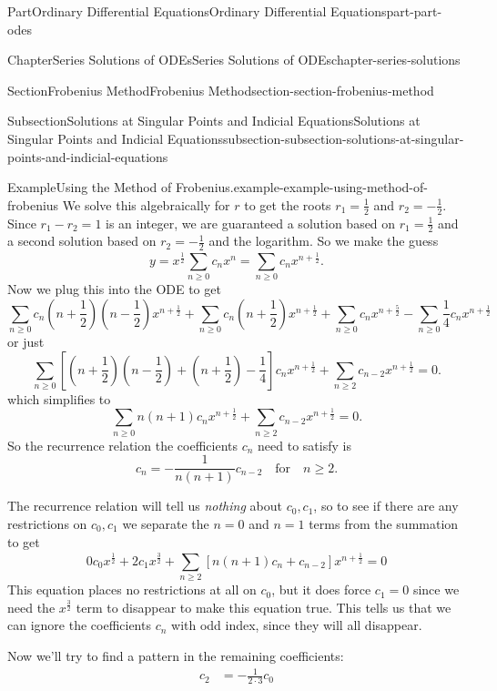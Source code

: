 \documentclass[twoside,10pt,]{book}
\numberwithin{equation}{part}
\begin{document}
\begin{partptx}{Part}{Ordinary Differential Equations}{}{Ordinary Differential Equations}{}{}{part-part-odes}
\begin{chapterptx}{Chapter}{Series Solutions of ODEs}{}{Series Solutions of ODEs}{}{}{chapter-series-solutions}
\begin{sectionptx}{Section}{Frobenius Method}{}{Frobenius Method}{}{}{section-section-frobenius-method}
\begin{subsectionptx}{Subsection}{Solutions at Singular Points and Indicial Equations}{}{Solutions at Singular Points and Indicial Equations}{}{}{subsection-subsection-solutions-at-singular-points-and-indicial-equations}
\begin{example}{Example}{Using the Method of Frobenius.}{example-example-using-method-of-frobenius}
We solve this algebraically for \(r\) to get the roots \(r_{1}=\frac{1}{2}\) and \(r_{2}=-\frac{1}{2}\). Since \(r_{1}-r_{2} = 1\) is an integer, we are guaranteed a solution based on \(r_{1} = \frac{1}{2}\) and a second solution based on \(r_{2} = -\frac{1}{2}\) and the logarithm. So we make the guess%
\begin{equation*}
y = x^{\frac{1}{2}}\sum_{n\geq0}^{}c_{n}x^{n} = \sum_{n\geq0}^{}c_{n}x^{n+\frac{1}{2}}.
\end{equation*}
Now we plug this into the ODE to get%
\begin{equation*}
\sum_{n\geq0}c_{n}(n+\frac{1}{2})(n-\frac{1}{2})x^{n+\frac{1}{2}} + \sum_{n\geq0}c_{n}(n+\frac{1}{2})x^{n+\frac{1}{2}} 
+ \sum_{n\geq0}c_{n}x^{n+\frac{5}{2}} - \sum_{n\geq0}\frac{1}{4}c_{n}x^{n+\frac{1}{2}}
\end{equation*}
or just%
\begin{equation*}
\sum_{n\geq0}^{}\left[(n+\frac{1}{2})(n-\frac{1}{2})+(n+\frac{1}{2})-\frac{1}{4}\right]c_{n}x^{n+\frac{1}{2}} 
+\sum_{n\geq2}^{}c_{n-2}x^{n+\frac{1}{2}}=0.
\end{equation*}
which simplifies to%
\begin{equation*}
\sum_{n\geq0} n(n+1)c_{n}x^{n+\frac{1}{2}}+\sum_{n\geq2}c_{n-2}x^{n+\frac{1}{2}} = 0.
\end{equation*}
So the recurrence relation the coefficients \(c_{n}\) need to satisfy is%
\begin{equation*}
c_{n} = -\frac{1}{n(n+1)}c_{n-2}\quad\text{for}\quad n\geq2.
\end{equation*}
%
\par
The recurrence relation will tell us \emph{nothing} about \(c_{0},c_{1}\), so to see if there are any restrictions on \(c_{0},c_{1}\) we separate the \(n=0\) and \(n=1\) terms from the summation to get%
\begin{equation*}
0c_{0}x^{\frac{1}{2}}+2c_{1}x^{\frac{3}{2}}+\sum_{n\geq2}^{}\left[n(n+1)c_{n}+c_{n-2}\right]x^{n+\frac{1}{2}}=0
\end{equation*}
This equation places no restrictions at all on \(c_{0}\), but it does force \(c_{1} = 0\) since we need the \(x^{\frac{3}{2}}\) term to disappear to make this equation true. This tells us that we can ignore the coefficients \(c_{n}\) with odd index, since they will all disappear.%
\par
Now we'll try to find a pattern in the remaining coefficients:%
\begin{align*}
c_{2} &= -\frac{1}{2\cdot3}c_{0}\\

\end{align*}
\end{example}
\end{subsectionptx}
\end{sectionptx}
\end{chapterptx}
\end{partptx}
\end{document}
